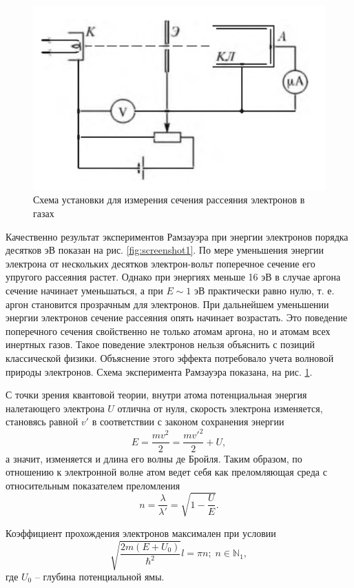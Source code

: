 \documentclass[a4paper]{article}
\begin{document}
\begin{figure}
	\centering
	\includegraphics[width=0.5\linewidth]{Screenshot_2}
	\caption{Схема установки для измерения сечения рассеяния электронов в газах}
	\label{fig:screenshot2}
\end{figure}
Качественно результат экспериментов Рамзауэра при энергии электронов порядка десятков эВ показан на рис. \ref{fig:screenshot1}.
По мере уменьшения энергии электрона от нескольких десятков электрон-вольт поперечное сечение его упругого рассеяния растет. Однако при энергиях меньше 16 эВ в случае аргона сечение начинает уменьшаться, а при $ E \sim 1 $ эВ практически равно нулю, т. е. аргон становится прозрачным для электронов. При дальнейшем уменьшении энергии электронов сечение рассеяния опять начинает возрастать. Это поведение поперечного сечения свойственно не только атомам аргона, но и атомам всех инертных газов. Такое поведение электронов нельзя объяснить с позиций классической физики. Объяснение этого эффекта потребовало учета волновой природы электронов. Схема эксперимента Рамзауэра показана, на рис. \ref{fig:screenshot2}.


С точки зрения квантовой теории, внутри атома потенциальная энергия налетающего электрона $ U $ отлична от нуля, скорость электрона изменяется, становясь равной $ v' $ в соответствии с законом сохранения энергии
\begin{equation*}
	E = \frac{m v^2}{2} = \frac{m v'^2}{2}+ U,
\end{equation*}
а значит, изменяется и длина его волны де Бройля. Таким образом, по отношению к электронной волне атом ведет себя как преломляющая среда с относительным показателем преломления
\begin{equation*}
	n = \frac{\lambda}{\lambda'} = \sqrt{1-\frac{U}{E}}.
\end{equation*}

Коэффициент прохождения электронов максимален при условии
\begin{equation}\label{eq:at}
	\sqrt{\frac{2 m (E+U_0)}{\hbar^2}}l = \pi n;\; n \in \mathbb{N}_1,
\end{equation}
где $ U_0 $ -- глубина потенциальной ямы.
\end{document}
